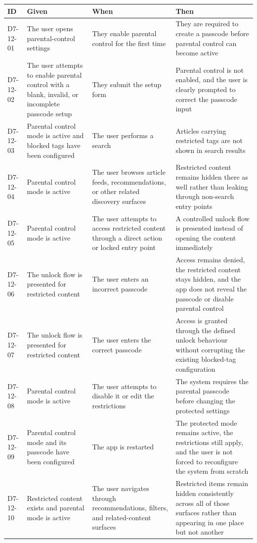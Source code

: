 \documentclass[a4paper, 12pt]{article}
\begin{document}
    \begin{longtable}
        {|L{0.12\textwidth}|L{0.24\textwidth}|L{0.24\textwidth}|L{0.32\textwidth}|}
        \hline \textbf{ID} & \textbf{Given} & \textbf{When} & \textbf{Then} \\
        \hline \endhead D7-12-01 & The user opens parental-control settings & They
        enable parental control for the first time & They are required to create
        a passcode before parental control can become active \\
        \hline D7-12-02 & The user attempts to enable parental control with a blank,
        invalid, or incomplete passcode setup & They submit the setup form & Parental
        control is not enabled, and the user is clearly prompted to correct the
        passcode input \\
        \hline D7-12-03 & Parental control mode is active and blocked tags have
        been configured & The user performs a search & Articles carrying
        restricted tags are not shown in search results \\
        \hline D7-12-04 & Parental control mode is active & The user browses
        article feeds, recommendations, or other related discovery surfaces &
        Restricted content remains hidden there as well rather than leaking
        through non-search entry points \\
        \hline D7-12-05 & Parental control mode is active & The user attempts to
        access restricted content through a direct action or locked entry point
        & A controlled unlock flow is presented instead of opening the content
        immediately \\
        \hline D7-12-06 & The unlock flow is presented for restricted content &
        The user enters an incorrect passcode & Access remains denied, the restricted
        content stays hidden, and the app does not reveal the passcode or
        disable parental control \\
        \hline D7-12-07 & The unlock flow is presented for restricted content &
        The user enters the correct passcode & Access is granted through the
        defined unlock behaviour without corrupting the existing blocked-tag
        configuration \\
        \hline D7-12-08 & Parental control mode is active & The user attempts to
        disable it or edit the restrictions & The system requires the parental
        passcode before changing the protected settings \\
        \hline D7-12-09 & Parental control mode and its passcode have been
        configured & The app is restarted & The protected mode remains active, the
        restrictions still apply, and the user is not forced to reconfigure the
        system from scratch \\
        \hline D7-12-10 & Restricted content exists and parental mode is active
        & The user navigates through recommendations, filters, and related-content
        surfaces & Restricted items remain hidden consistently across all of
        those surfaces rather than appearing in one place but not another \\
        \hline
    \end{longtable}
\end{document}
